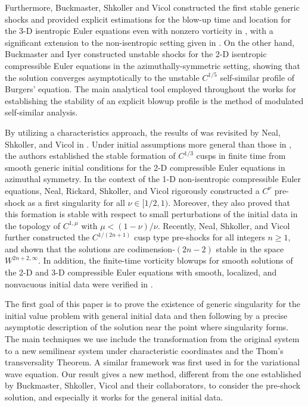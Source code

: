 \documentclass[11pt,reqno]{article}
\numberwithin{equation}{section}
\begin{document}
Furthermore, Buckmaster, Shkoller and Vicol constructed the first stable generic shocks and provided explicit estimations for the blow-up time and location for the 3-D isentropic Euler equations even with nonzero vorticity in \cite{BSV3}, with a significant extension to the non-isentropic setting given in \cite{BSV2}. On the other hand,
Buckmaster and Iyer \cite{BI} constructed unstable shocks for the 2-D isentropic compressible Euler equations in the azimuthally-symmetric setting, showing that the solution converges asymptotically to the unstable $C^{1/5}$ self-similar profile of Burgers' equation.
The main analytical tool employed throughout the works \cite{BI, BSV1, BSV2, BSV3, BDSV} for establishing the stability of an explicit blowup profile is the method of modulated self-similar analysis.


By utilizing a characteristics approach, the results of \cite{BDSV} was revisited by Neal, Shkoller, and Vicol in \cite{NSV1}. Under initial assumptions more general than those in \cite{BDSV}, the authors established the stable formation of $C^{1/3}$ cusps in finite time from smooth generic initial conditions for the 2-D compressible Euler equations in azimuthal symmetry.
In the context of the 1-D non-isentropic compressible Euler equations, Neal, Rickard, Shkoller, and Vicol \cite{NRSV} rigorously constructed a \(C^\nu\) pre-shock as a first singularity for all $\nu\in[1/2,1)$. Moreover, they also proved that this formation is
stable with respect to small perturbations of the initial data in the topology of $C^{1,\mu}$ with $\mu<(1-\nu)/\nu$. Recently, Neal,  Shkoller, and Vicol \cite{NSV2} further constructed the $C^{1/(2n+1)}$ cusp type pre-shocks for all integers $n\geq1$, and shown that the solutions are codimension-$(2n-2)$ stable in the space $W^{2n+2,\infty}$. In addition,
the finite-time vorticity blowups for smooth solutions of the 2-D and 3-D compressible Euler equations with smooth, localized, and nonvacuous initial data were verified in \cite{Chenj1, Chenj2}.

The first goal of this paper is to prove the existence of generic singularity for the initial value problem with general initial data and then following by a precise asymptotic description of the solution near the point where singularity forms. The main techniques we use include the transformation from the original system to a new semilinear system under characteristic coordinates and the Thom's transversality Theorem. A similar framework was first used in \cite{BC1,BHY} for the variational wave equation. Our result gives a new method, different from the one established by Buckmaster, Shkoller, Vicol and their collaborators, to consider the pre-shock solution, and especially it works for the general initial data.
\end{document}
